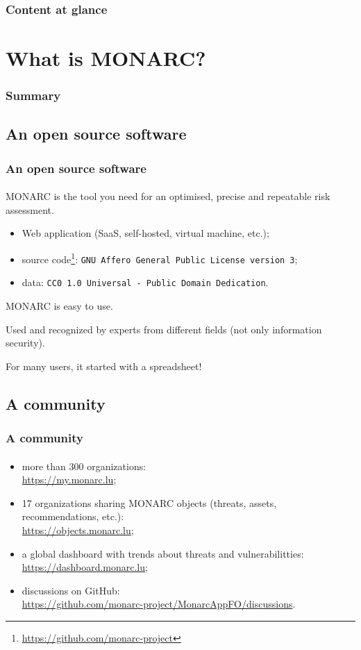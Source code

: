 \setcounter{tocdepth}{1}
\begin{frame}
  \frametitle{Content at glance}
  \tableofcontents
\end{frame}
\setcounter{tocdepth}{4}

%
%
\section{What is MONARC?}
\begin{frame}
  \frametitle{Summary}
\end{frame}
\subsection{An open source software}
\begin{frame}
  \frametitle{An open source software}
  \framesubtitle{}
  MONARC is the tool you need for an optimised, precise and repeatable risk assessment.

  \bigskip
  \begin{itemize}
    \item Web application (SaaS, self-hosted, virtual machine, etc.);
    \item source code\footnote{\url{https://github.com/monarc-project}}:
    \texttt{GNU Affero General Public License version 3};
    \item data: \texttt{CC0 1.0 Universal - Public Domain Dedication}.
  \end{itemize}

  \bigskip
  MONARC is easy to use.

  Used and recognized by experts from different fields (not only information security).

  \bigskip
  For many users, it started with a spreadsheet!
\end{frame}

\subsection{A community}
\begin{frame}
  \frametitle{A community}
  \framesubtitle{}
  \begin{itemize}
    \item more than 300 organizations:\\ \url{https://my.monarc.lu};
    \item 17 organizations sharing MONARC objects (threats, assets, recommendations, etc.):\\
    \url{https://objects.monarc.lu};
    \item a global dashboard with trends about threats and vulnerabilitties:\\
    \url{https://dashboard.monarc.lu};
    \item discussions on GitHub:\\
    \url{https://github.com/monarc-project/MonarcAppFO/discussions}.
  \end{itemize}
\end{frame}

